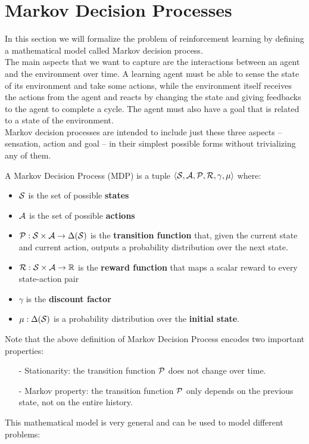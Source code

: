 \section{Markov Decision Processes}
\label{sec:mdp}
In this section we will formalize the problem of reinforcement learning by defining a mathematical model called Markov decision process.\\
The main aspects that we want to capture are the interactions between an agent and the environment over time. A learning agent must be able to sense the state of its environment and take some actions, while the environment itself receives the actions from the agent and reacts by changing the state and giving feedbacks to the agent to complete a cycle.
The agent must also have a goal that is related to a state of the environment.\\
Markov decision processes are intended to include just these three aspects -- sensation, action and goal -- in their simplest possible forms without trivializing any of them.

\begin{definition}
A Markov Decision Process (MDP) is a tuple $\left\langle \mathcal{S}, \mathcal{A}, \mathcal{P}, \mathcal{R}, \gamma, \mu \right\rangle$  where:
\begin{itemize}
\item $\mathcal{S}$ is the set of possible \textbf{states}
\item $\mathcal{A}$ is the set of possible \textbf{actions}
\item $\mathcal{P} : \mathcal{S} \times \mathcal{A} \rightarrow \Delta (\mathcal{S})$ is the \textbf{transition function} that, given the current state and current action, outputs a probability distribution over the next state.
\item $\mathcal{R} : \mathcal{S} \times \mathcal{A} \rightarrow \mathbb{R}$ is the \textbf{reward function} that maps a scalar reward to every state-action pair
\item $\gamma$ is the \textbf{discount factor}
\item $\mu : \Delta ( \mathcal{S} )$ is a probability distribution over the \textbf{initial state}. 
\end{itemize}
\end{definition}

Note that the above definition of Markov Decision Process encodes two important properties:
\begin{itemize}
\item[-] Stationarity: the transition function $\mathcal{P}$ does not change over time.
\item[-] Markov property: the transition function $\mathcal{P}$ only depends on the previous state, not on the entire history.
\end{itemize}
This mathematical model is very general and can be used to model different problems:

